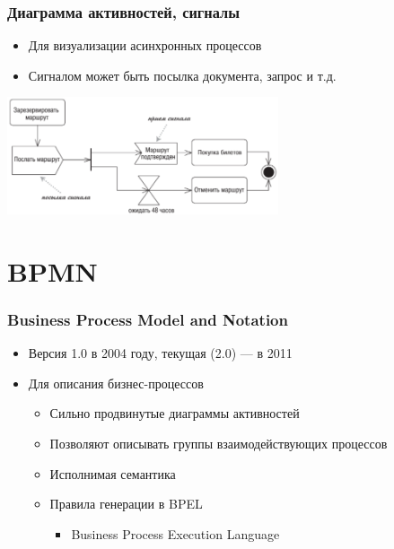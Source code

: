 \documentclass{../cscslides}
\begin{document}
    \begin{frame}
        \frametitle{Диаграмма активностей, сигналы}
        \begin{itemize}
            \item Для визуализации асинхронных процессов
            \item Сигналом может быть посылка документа, запрос и т.д.
        \end{itemize}
        \begin{center}
            \includegraphics[width=0.6\textwidth]{activitySignals.png}
        \end{center}
    \end{frame}

    \section{BPMN}

    \begin{frame}
        \frametitle{Business Process Model and Notation}
        \begin{itemize}
            \item Версия 1.0 в 2004 году, текущая (2.0) --- в 2011
            \item Для описания бизнес-процессов
            \begin{itemize}
                \item Сильно продвинутые диаграммы активностей
                \item Позволяют описывать группы взаимодействующих процессов
                \item Исполнимая семантика
                \item Правила генерации в BPEL
                \begin{itemize}
                    \item Business Process Execution Language
                \end{itemize}
            \end{itemize}
        \end{itemize}
    \end{frame}
\end{document}
